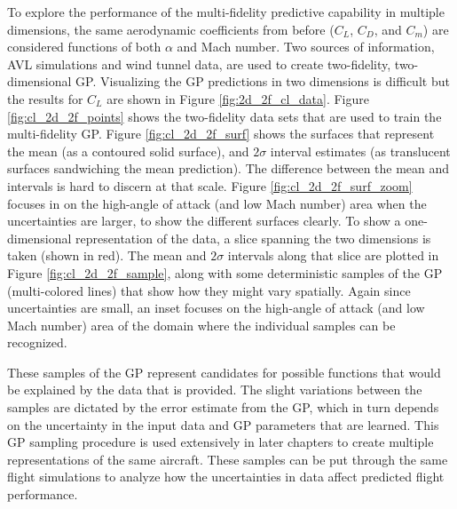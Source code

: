 To explore the performance of the multi-fidelity predictive capability in multiple dimensions, the same aerodynamic coefficients from before ($C_L$, $C_D$, and $C_m$) are considered functions of both $\alpha$ and Mach number.
Two sources of information, AVL simulations and wind tunnel data, are used to create two-fidelity, two-dimensional GP.
Visualizing the GP predictions in two dimensions is difficult but the results for $C_L$ are shown in Figure \ref{fig:2d_2f_cl_data}.
Figure \ref{fig:cl_2d_2f_points} shows the two-fidelity data sets that are used to train the multi-fidelity GP.
Figure \ref{fig:cl_2d_2f_surf} shows the surfaces that represent the mean (as a contoured solid surface), and $2\sigma$ interval estimates (as translucent surfaces sandwiching the mean prediction).
The difference between the mean and intervals is hard to discern at that scale.
Figure \ref{fig:cl_2d_2f_surf_zoom} focuses in on the high-angle of attack (and low Mach number) area when the uncertainties are larger, to show the different surfaces clearly.
To show a one-dimensional representation of the data, a slice spanning the two dimensions is taken (shown in red).
The mean and $2\sigma$ intervals along that slice are plotted in Figure \ref{fig:cl_2d_2f_sample}, along with some deterministic samples of the GP (multi-colored lines) that show how they might vary spatially.
Again since uncertainties are small, an inset focuses on the high-angle of attack (and low Mach number) area of the domain where the individual samples can be recognized.

These samples of the GP represent candidates for possible functions that would be explained by the data that is provided. 
The slight variations between the samples are dictated by the error estimate from the GP, which in turn depends on the uncertainty in the input data and GP parameters that are learned. 
This GP sampling procedure is used extensively in later chapters to create multiple representations of the same aircraft. 
These samples can be put through the same flight simulations to analyze how the uncertainties in data affect predicted flight performance.

